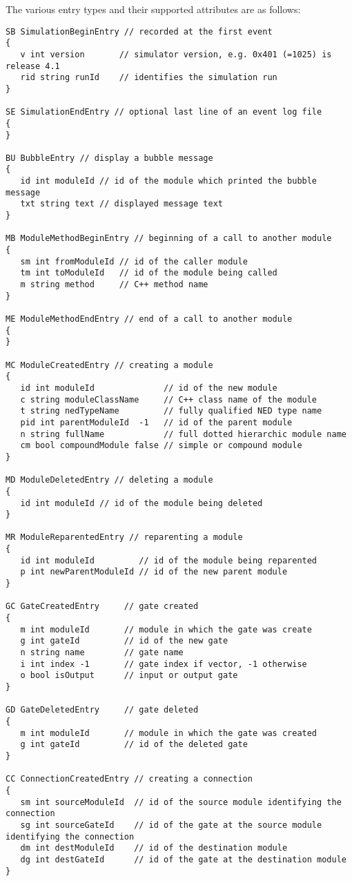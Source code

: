 The various entry types and their supported attributes are as follows:

\begin{verbatim}
SB SimulationBeginEntry // recorded at the first event
{
   v int version       // simulator version, e.g. 0x401 (=1025) is release 4.1
   rid string runId    // identifies the simulation run
}

SE SimulationEndEntry // optional last line of an event log file
{
}

BU BubbleEntry // display a bubble message
{
   id int moduleId // id of the module which printed the bubble message
   txt string text // displayed message text
}

MB ModuleMethodBeginEntry // beginning of a call to another module
{
   sm int fromModuleId // id of the caller module
   tm int toModuleId   // id of the module being called
   m string method     // C++ method name
}

ME ModuleMethodEndEntry // end of a call to another module
{
}

MC ModuleCreatedEntry // creating a module
{
   id int moduleId              // id of the new module
   c string moduleClassName     // C++ class name of the module
   t string nedTypeName         // fully qualified NED type name
   pid int parentModuleId  -1   // id of the parent module
   n string fullName            // full dotted hierarchic module name
   cm bool compoundModule false // simple or compound module
}

MD ModuleDeletedEntry // deleting a module
{
   id int moduleId // id of the module being deleted
}

MR ModuleReparentedEntry // reparenting a module
{
   id int moduleId         // id of the module being reparented
   p int newParentModuleId // id of the new parent module
}

GC GateCreatedEntry     // gate created
{
   m int moduleId       // module in which the gate was create
   g int gateId         // id of the new gate
   n string name        // gate name
   i int index -1       // gate index if vector, -1 otherwise
   o bool isOutput      // input or output gate
}

GD GateDeletedEntry     // gate deleted
{
   m int moduleId       // module in which the gate was created
   g int gateId         // id of the deleted gate
}

CC ConnectionCreatedEntry // creating a connection
{
   sm int sourceModuleId  // id of the source module identifying the connection
   sg int sourceGateId    // id of the gate at the source module identifying the connection
   dm int destModuleId    // id of the destination module
   dg int destGateId      // id of the gate at the destination module
}


\end{verbatim}
